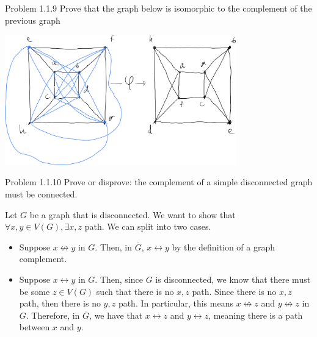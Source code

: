 \documentclass[8pt]{extarticle}
\begin{document}
  \begin{mathbox}{Problem 1.1.9}
      Prove that the graph below is isomorphic to the complement of the previous graph
  \begin{center}
  \end{center} 
      \tcblower
  \begin{center}
    \includegraphics[width=10cm]{1_1_9}
  \end{center}
    \end{mathbox}
  \begin{mathbox}{Problem 1.1.10}
       Prove or disprove: the complement of a simple disconnected graph must be connected.
       \tcblower

   Let $G$ be a graph that is disconnected. We want to show that $\forall x,y\in V(G), \exists x,z$ path. We can split into two cases.
     \begin{itemize}
       \item Suppose $x\not\leftrightarrow y$ in $G$. Then, in $\overline{G}$, $x\leftrightarrow y$ by the definition of a graph complement.
       \item Suppose $x\leftrightarrow y$ in $G$. Then, since $G$ is disconnected, we know that there must be some $z\in V(G)$ such that there is no $x,z$ path. Since there is no $x,z$ path, then there is no $y,z$ path. In particular, this means $x\not\leftrightarrow z$ and $y\not\leftrightarrow z$ in $G$. Therefore, in $\overline{G}$, we have that $x\leftrightarrow z$ and $y\leftrightarrow z$, meaning there is a path between $x$ and $y$.
     \end{itemize}
     \end{mathbox} 
\end{document}
